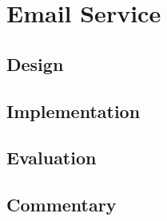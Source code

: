 \section{Email Service}
\label{sec:email}

\subsection{Design}

\subsection{Implementation}

\subsection{Evaluation}

\subsection{Commentary}